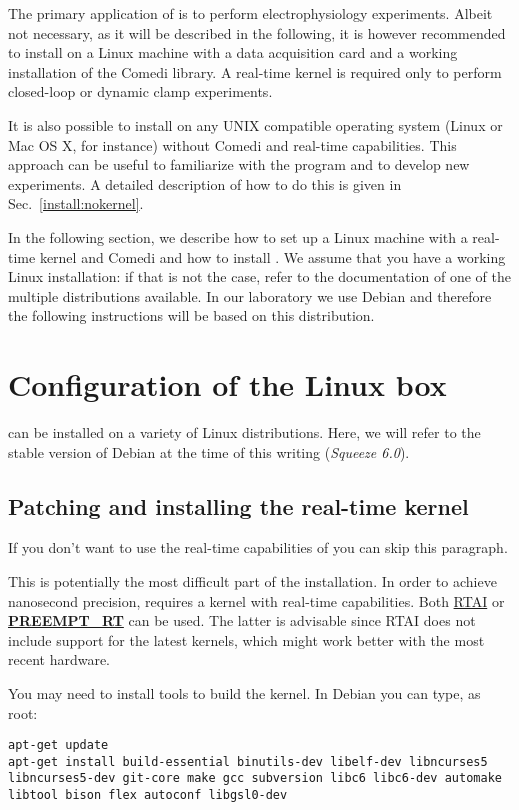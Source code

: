 The primary application of \progname is to perform electrophysiology
experiments. Albeit not necessary, as it will be described in the
following, it is however recommended to install \progname on a Linux
machine with a data acquisition card and a working installation of the
Comedi library. A real-time kernel is required only to perform
closed-loop or dynamic clamp experiments.

It is also possible to install \progname on any UNIX compatible
operating system (Linux or Mac OS X, for instance) without Comedi and
real-time capabilities. This approach can be useful to familiarize
with the program and to develop new experiments. A detailed
description of how to do this is given in Sec.~\ref{install:nokernel}.

In the following section, we describe how to set up a Linux machine
with a real-time kernel and Comedi and how to install \progname. We
assume that you have a working Linux installation: if that is not the
case, refer to the documentation of one of the multiple distributions
available. In our laboratory we use Debian and therefore the
following instructions will be based on this distribution.

\section{Configuration of the Linux box}
\progname can be installed on a variety of Linux distributions. Here,
we will refer to the stable version of Debian at the time of this
writing (\emph{Squeeze 6.0}).

\subsection{Patching and installing the real-time kernel}
If you don't want to use the real-time capabilities of \progname you
can skip this paragraph.

This is potentially the most difficult part of the installation. In
order to achieve nanosecond precision, \progname requires a kernel
with real-time capabilities. Both \href{http://www.rtai.org}{RTAI} or
\textbf{\href{https://rt.wiki.kernel.org/index.php/Main\_Page}{PREEMPT\_RT}}
can be used. The latter is advisable since RTAI does not include
support for the latest kernels, which might work better with the most
recent hardware.

You may need to install tools to build the kernel. In Debian you can
type, as root:
\begin{lstlisting}
apt-get update
apt-get install build-essential binutils-dev libelf-dev libncurses5 libncurses5-dev git-core make gcc subversion libc6 libc6-dev automake libtool bison flex autoconf libgsl0-dev 
\end{lstlisting}

